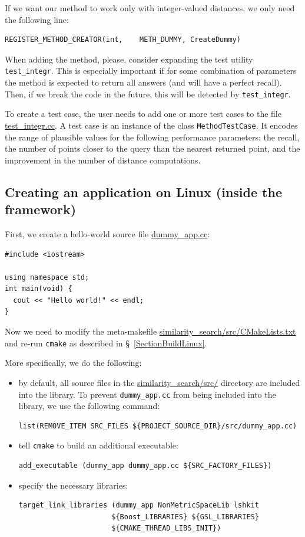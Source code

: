 \documentclass[runningheads,a4paper]{llncs}
\newcommand{\replocfile}{https://github.com/searchivarius/nmslib/blob/v1.5/}
\newcommand{\ttt}[1]{\texttt{#1}}
\begin{document}
If we want our method to work only with integer-valued distances,
we only need the following line:
\begin{verbatim}
REGISTER_METHOD_CREATOR(int,    METH_DUMMY, CreateDummy)
\end{verbatim}

When adding the method, please, consider expanding
the test utility \ttt{test\_integr}.
This is especially important if for some combination of parameters the method is expected
to return all answers (and will have a perfect recall). Then, if we break the code in the future,
this will be detected by \ttt{test\_integr}.

To create a test case, the user needs to add one or more test cases 
to the file
\href{\replocfile similarity_search/test/test_integr.cc#L65}{test\_integr.cc}. 
A test case is an instance of the class \ttt{MethodTestCase}. 
It encodes the range of plausible values
for the following performance parameters: the recall,
the number of points closer to the query than the nearest returned point,
and the improvement in the number of distance computations.

\subsection{Creating an application on Linux (inside the framework)}\label{SectionCreateAppLinux}
First, we create a hello-world source file 
\href{\replocfile similarity_search/src/dummy_app.cc}{dummy\_app.cc}:
\begin{verbatim}
#include <iostream>

using namespace std;
int main(void) {
  cout << "Hello world!" << endl;
}
\end{verbatim}
Now we need to modify the meta-makefile
\href{\replocfile similarity_search/src/CMakeLists.txt}{similarity\_search/src/CMakeLists.txt} and 
re-run \ttt{cmake} as described in \S~\ref{SectionBuildLinux}.

More specifically, we do the following:
\begin{itemize}
\item by default, all source files in the  
\href{\replocfile similarity_search/src/}{similarity\_search/src/} directory are included into the library.
To prevent \ttt{dummy\_app.cc} from being included into the library, we use the following command:
\begin{verbatim}
list(REMOVE_ITEM SRC_FILES ${PROJECT_SOURCE_DIR}/src/dummy_app.cc)
\end{verbatim}

\item tell \ttt{cmake} to build an additional executable:
\begin{verbatim}
add_executable (dummy_app dummy_app.cc ${SRC_FACTORY_FILES})
\end{verbatim}

\item specify the necessary libraries:
\begin{verbatim}
target_link_libraries (dummy_app NonMetricSpaceLib lshkit 
                      ${Boost_LIBRARIES} ${GSL_LIBRARIES} 
                      ${CMAKE_THREAD_LIBS_INIT})
\end{verbatim}
\end{itemize}
\end{document}
